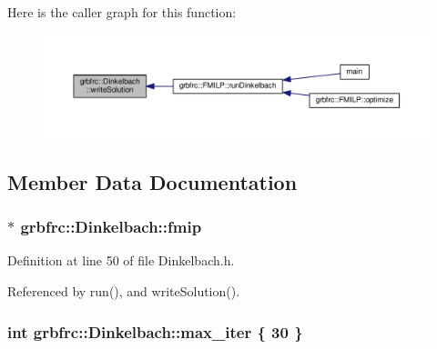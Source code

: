 Here is the caller graph for this function\+:
\nopagebreak
\begin{figure}[H]
\begin{center}
\leavevmode
\includegraphics[width=350pt]{classgrbfrc_1_1Dinkelbach_a9a27c81b1b70feeabebb17a65f6ada30_icgraph}
\end{center}
\end{figure}




\subsection{Member Data Documentation}
\subsubsection[{\texorpdfstring{fmip}{fmip}}]{$\ast$ grbfrc\+::\+Dinkelbach\+::fmip\hspace{0.3cm}{\ttfamily [private]}}\hypertarget{classgrbfrc_1_1Dinkelbach_aa7b46a3cb24f1ec0f278edaa2348729d}{}\label{classgrbfrc_1_1Dinkelbach_aa7b46a3cb24f1ec0f278edaa2348729d}


Definition at line 50 of file Dinkelbach.\+h.



Referenced by run(), and write\+Solution().

\subsubsection[{\texorpdfstring{max\+\_\+iter}{max_iter}}]{\setlength{\rightskip}{0pt plus 5cm}int grbfrc\+::\+Dinkelbach\+::max\+\_\+iter \{ 30 \}\hspace{0.3cm}{\ttfamily [private]}}\hypertarget{classgrbfrc_1_1Dinkelbach_a732fd0c62a20a624dbd5d9ab95f5d9c7}{}\label{classgrbfrc_1_1Dinkelbach_a732fd0c62a20a624dbd5d9ab95f5d9c7}


